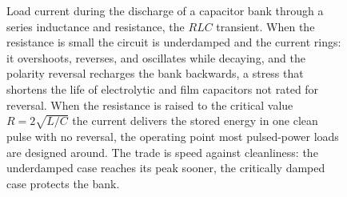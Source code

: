 \begin{figure}[htbp]
\centering
{}
\caption[Pulsed discharge of a capacitor bank]{Load current during the
discharge of a capacitor bank through a series inductance and
resistance, the $RLC$ transient. When the resistance is small the
circuit is underdamped and the current rings: it overshoots, reverses,
and oscillates while decaying, and the polarity reversal recharges the
bank backwards, a stress that shortens the life of electrolytic and
film capacitors not rated for reversal. When the resistance is raised to
the critical value $R = 2\sqrt{L/C}$ the current delivers the stored
energy in one clean pulse with no reversal, the operating point most
pulsed-power loads are designed around. The trade is speed against
cleanliness: the underdamped case reaches its peak sooner, the
critically damped case protects the bank.}
\label{fig:vol04ch08:capacitor-discharge}
\end{figure}
